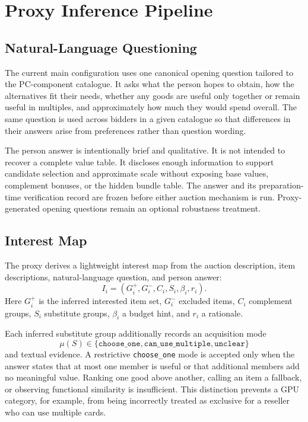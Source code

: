 \section{Proxy Inference Pipeline}

\subsection{Natural-Language Questioning}

The current main configuration uses one canonical opening question tailored
to the PC-component catalogue. It asks what the person hopes to obtain, how
the alternatives fit their needs, whether any goods are useful only together
or remain useful in multiples, and approximately how much they would spend
overall. The same question is used across bidders in a given catalogue so
that differences in their answers arise from preferences rather than
question wording.

The person answer is intentionally brief and qualitative. It is not intended
to recover a complete value table. It discloses enough information to support
candidate selection and approximate scale without exposing base values,
complement bonuses, or the hidden bundle table. The answer and its
preparation-time verification record are frozen before either auction
mechanism is run. Proxy-generated opening questions remain an optional
robustness treatment.

\subsection{Interest Map}

The proxy derives a lightweight interest map from the auction description, item descriptions, natural-language question, and person answer:
\[
I_i=(G_i^+,G_i^-,C_i,S_i,\beta_i,r_i).
\]
Here \(G_i^+\) is the inferred interested item set, \(G_i^-\) excluded items, \(C_i\) complement groups, \(S_i\) substitute groups, \(\beta_i\) a budget hint, and \(r_i\) a rationale.

Each inferred substitute group additionally records an acquisition mode
\[
\mu(S)\in
\{\texttt{choose\_one},\texttt{can\_use\_multiple},\texttt{unclear}\}
\]
and textual evidence. A restrictive \texttt{choose\_one} mode is accepted
only when the answer states that at most one member is useful or that
additional members add no meaningful value. Ranking one good above another,
calling an item a fallback, or observing functional similarity is
insufficient. This distinction prevents a GPU category, for example, from
being incorrectly treated as exclusive for a reseller who can use multiple
cards.

